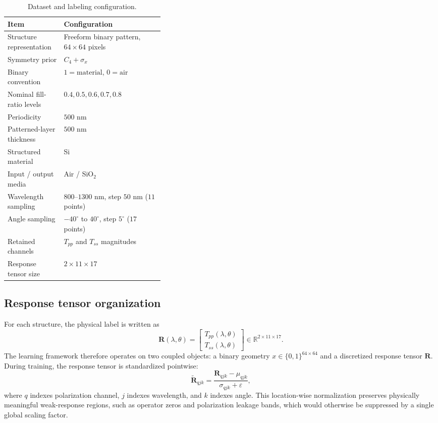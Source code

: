 \documentclass[10pt,a4paper]{article}
\newcommand{\tp}{T_{pp}}
\newcommand{\ts}{T_{ss}}
\newcommand{\lam}{\lambda}
\newcommand{\ang}{\theta}
\begin{document}
\begin{table}[!htbp]
\centering
\caption{Dataset and labeling configuration.}
\begin{tabularx}{\linewidth}{>{\raggedright\arraybackslash}p{0.36\linewidth}X}
\toprule
Item & Configuration \\
\midrule
Structure representation & Freeform binary pattern, $64\times64$ pixels \\
Symmetry prior & $C_4+\sigma_x$ \\
Binary convention & $1=\mathrm{material}$, $0=\mathrm{air}$ \\
Nominal fill-ratio levels & $0.4, 0.5, 0.6, 0.7, 0.8$ \\
Periodicity & $500$ nm \\
Patterned-layer thickness & $500$ nm \\
Structured material & Si \\
Input / output media & Air / SiO$_2$ \\
Wavelength sampling & $800$--$1300$ nm, step $50$ nm ($11$ points) \\
Angle sampling & $-40^\circ$ to $40^\circ$, step $5^\circ$ ($17$ points) \\
Retained channels & $\tp$ and $\ts$ magnitudes \\
Response tensor size & $2\times11\times17$ \\
\bottomrule
\end{tabularx}
\end{table}

\subsection{Response tensor organization}

For each structure, the physical label is written as
\begin{equation}
\mathbf{R}(\lam,\ang)=
\begin{bmatrix}
\tp(\lam,\ang)\\
\ts(\lam,\ang)
\end{bmatrix}
\in \mathbb{R}^{2\times 11\times 17}.
\end{equation}
The learning framework therefore operates on two coupled objects: a binary geometry $x\in\{0,1\}^{64\times64}$ and a discretized response tensor $\mathbf{R}$. During training, the response tensor is standardized pointwise:
\begin{equation}
\widetilde{\mathbf{R}}_{qjk}=\frac{\mathbf{R}_{qjk}-\mu_{qjk}}{\sigma_{qjk}+\varepsilon},
\end{equation}
where $q$ indexes polarization channel, $j$ indexes wavelength, and $k$ indexes angle. This location-wise normalization preserves physically meaningful weak-response regions, such as operator zeros and polarization leakage bands, which would otherwise be suppressed by a single global scaling factor.
\end{document}
